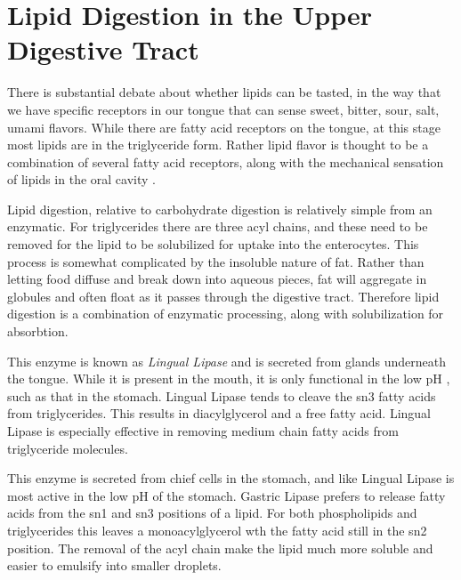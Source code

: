 \documentclass{tufte-handout}
\begin{document}
\section{Lipid Digestion in the Upper Digestive Tract}

There is substantial debate about whether lipids can be tasted, in the way that we have specific receptors in our tongue that can sense sweet, bitter, sour, salt, umami flavors.  While there are fatty acid receptors on the tongue, at this stage most lipids are in the triglyceride form.  Rather lipid flavor is thought to be a combination of several fatty acid receptors, along with the mechanical sensation of lipids in the oral cavity \citep{DiPatrizio2014}.

Lipid digestion, relative to carbohydrate digestion is relatively simple from an enzymatic.  For triglycerides there are three acyl chains, and these need to be removed for the lipid to be solubilized for uptake into the enterocytes.  This process is somewhat complicated by the insoluble nature of fat.  Rather than letting food diffuse and break down into aqueous pieces, fat will aggregate in globules and often float as it passes through the digestive tract.  Therefore lipid digestion is a combination of enzymatic processing, along with solubilization for absorbtion.

  This enzyme is known as \emph{Lingual Lipase} and is secreted from glands underneath the tongue.  While it is present in the mouth, it is only functional in the low pH , such as that in the stomach.  Lingual Lipase tends to cleave the sn3 fatty acids from triglycerides.  This results in diacylglycerol and a free fatty acid. Lingual Lipase is especially effective in removing medium chain fatty acids from triglyceride molecules\citep{Jensen1983}.

  This enzyme is secreted from chief cells in the stomach, and like Lingual Lipase is most active in the low pH of the stomach.  Gastric Lipase prefers to release fatty acids from the sn1 and sn3 positions of a lipid.  For both phospholipids and triglycerides this leaves a monoacylglycerol wth the fatty acid still in the sn2 position.  The removal of the acyl chain make the lipid much more soluble and easier to emulsify into smaller droplets.
\end{document}
